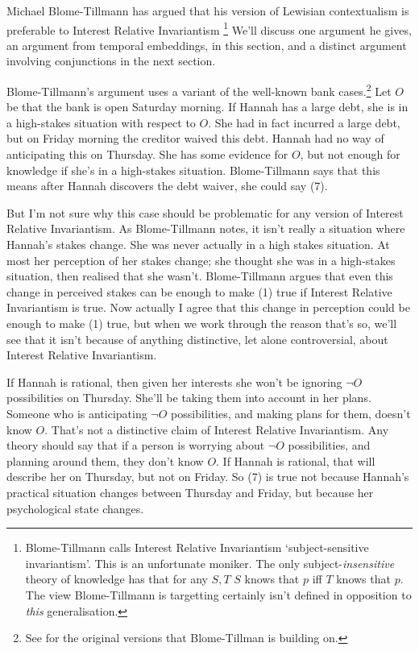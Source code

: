 Michael Blome-Tillmann has argued that his version of Lewisian contextualism is preferable to Interest Relative Invariantism \citep{MBT2009}\footnote{Blome-Tillmann calls Interest Relative Invariantism `subject-sensitive invariantism'. This is an unfortunate moniker. The only subject-\textit{insensitive} theory of knowledge has that for any \(S, T\) \(S\) knows that \(p\) iff \(T\) knows that \(p\). The view Blome-Tillmann is targetting certainly isn't defined in opposition to \textit{this} generalisation.} We'll discuss one argument he gives, an argument from temporal embeddings, in this section, and a distinct argument involving conjunctions in the next section.

Blome-Tillmann's argument uses a variant of the well-known bank cases.\footnote{See \cite{Stanley2005-STAKAP} for the original versions that Blome-Tillman is building on.} Let \(O\) be that the bank is open Saturday morning. If Hannah has a large debt, she is in a high-stakes situation with respect to \(O\). She had in fact incurred a large debt, but on Friday morning the creditor waived this debt. Hannah had no way of anticipating this on Thursday. She has some evidence for \(O\), but not enough for knowledge if she's in a high-stakes situation. Blome-Tillmann says that this means after Hannah discovers the debt waiver, she could say (7).


\noindent But I'm not sure why this case should be problematic for any version of Interest Relative Invariantism. As Blome-Tillmann notes, it isn't really a situation where Hannah's stakes change. She was never actually in a high stakes situation. At most her perception of her stakes change; she thought she was in a high-stakes situation, then realised that she wasn't. Blome-Tillmann argues that even this change in perceived stakes can be enough to make (1) true if Interest Relative Invariantism is true. Now actually I agree that this change in perception could be enough to make (1) true, but when we work through the reason that's so, we'll see that it isn't because of anything distinctive, let alone controversial, about Interest Relative Invariantism.

If Hannah is rational, then given her interests she won't be ignoring \(\neg O\) possibilities on Thursday. She'll be taking them into account in her plans. Someone who is anticipating \(\neg O\) possibilities, and making plans for them, doesn't know \(O\). That's not a distinctive claim of Interest Relative Invariantism. Any theory should say that if a person is worrying about \(\neg O\) possibilities, and planning around them, they don't know \(O\). If Hannah is rational, that will describe her on Thursday, but not on Friday. So (7) is true not because Hannah's practical situation changes between Thursday and Friday, but because her psychological state changes.

